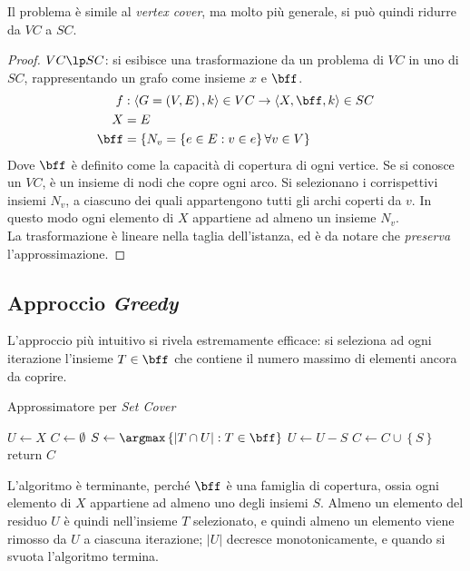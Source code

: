 Il problema è simile al \emph{vertex cover}, ma molto più generale, si può quindi ridurre da $VC$ a $SC$.
\begin{proof}
    $VC \lp SC$:
    si esibisce una trasformazione da un problema di $VC$ in uno di $SC$, rappresentando un grafo come insieme $x$ e $\bff$.
    \begin{align*}
        f
        &
        : 
        \langle G = \left( V,E \right), k \rangle 
        \in VC
        \to
        \langle X, \bff, k \rangle 
        \in SC
        \\*
        X &= E
        \\*
        \bff &= 
        \left\{ N_v = \left\{ 
                e \in E : v \in e
            \right\}
            \forall v \in V
        \right\}
    \end{align*}
    Dove $\bff$ è definito come la capacità di copertura di ogni vertice.
    Se si conosce un $VC$, è un insieme di nodi che copre ogni arco. Si selezionano i corrispettivi insiemi $N_v$, a ciascuno dei quali appartengono tutti gli archi coperti da $v$. In questo modo ogni elemento di $X$ appartiene ad almeno un insieme $N_v$.
    \\
    La trasformazione è lineare nella taglia dell'istanza, ed è da notare che \emph{preserva} l'approssimazione.
\end{proof}

\subsection{Approccio \emph{Greedy}}

L'approccio più intuitivo si rivela estremamente efficace: si seleziona ad ogni iterazione l'insieme $T \in \bff$ che contiene il numero massimo di elementi ancora da coprire.
\begin{algorithm}[H]
\caption{Approssimatore per \emph{Set Cover}}\label{alg:approxsc}
\begin{algorithmic}[1]
        \State $U \gets X$
        \State $C \gets \emptyset$
            \State $S \gets \argmax \left\{ | T \cap U | : T \in \bff \right\}$
            \State $U \gets U - S$
            \State $C \gets C \cup \left\{ S \right\}$
        \EndWhile
        \State return $C$
    \EndProcedure
\end{algorithmic}
\end{algorithm}
L'algoritmo è terminante, perché $\bff$ è una famiglia di copertura, ossia ogni elemento di $X$ appartiene ad almeno uno degli insiemi $S$.
Almeno un elemento del residuo $U$ è quindi nell'insieme $T$ selezionato, e quindi almeno un elemento viene rimosso da $U$ a ciascuna iterazione; $|U|$ decresce monotonicamente, e quando si svuota l'algoritmo termina.

